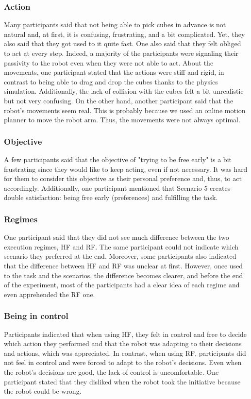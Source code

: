 \subsubsection{Action}
Many participants said that not being able to pick cubes in advance is not natural and, at first, it is confusing, frustrating, and a bit complicated. Yet, they also said that they got used to it quite fast. One also said that they felt obliged to act at every step. Indeed, a majority of the participants were signaling their passivity to the robot even when they were not able to act. 
About the movements, one participant stated that the actions were stiff and rigid, in contrast to being able to drag and drop the cubes thanks to the physics simulation. Additionally, the lack of collision with the cubes felt a bit unrealistic but not very confusing.
On the other hand, another participant said that the robot's movements seem real. This is probably because we used an online motion planner to move the robot arm. Thus, the movements were not always optimal.

\subsubsection{Objective}
A few participants said that the objective of "trying to be free early" is a bit frustrating since they would like to keep acting, even if not necessary. It was hard for them to consider this objective as their personal preference and, thus, to act accordingly. 
Additionally, one participant mentioned that Scenario 5 creates double satisfaction: being free early (preferences) and fulfilling the task.

\subsubsection{Regimes}
One participant said that they did not see much difference between the two execution regimes, HF and RF. The same participant could not indicate which scenario they preferred at the end. Moreover, some participants also indicated that the difference between HF and RF was unclear at first. However, once used to the task and the scenarios, the difference becomes clearer, and before the end of the experiment, most of the participants had a clear idea of each regime and even apprehended the RF one.

\subsubsection{Being in control}
Participants indicated that when using HF, they felt in control and free to decide which action they performed and that the robot was adapting to their decisions and actions, which was appreciated. In contrast, when using RF, participants did not feel in control and were forced to adapt to the robot's decisions. Even when the robot's decisions are good, the lack of control is uncomfortable. One participant stated that they disliked when the robot took the initiative because the robot could be wrong. 

